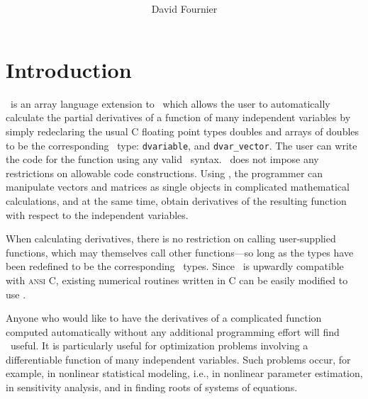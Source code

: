\documentclass{admbmanual}
\title{%
  \largetitlepart{AUTODIF}
  \smalltitlepartnonslanted{%
     A \cplus\ Array Language Extension\\ 
     with Automatic Differentiation\\
     for Use in Nonlinear Modeling and Statistics}
}
\author{David Fournier}
\newcommand{\question}[1]{\bigskip\noindent{\bf #1?}\par\medskip\noindent}
\begin{document}
\maketitle

\tableofcontents



\chapter{Introduction}
\label{ch:introduction}


\question{What is \scAD}
\scAD\ is an array language extension to \cplus\ which
allows the user to automatically calculate the partial derivatives
of a function of many independent variables by simply redeclaring the usual C floating point
types doubles and arrays of doubles to be the corresponding
\scAD\ type: \texttt{dvariable}, and \texttt{dvar\_vector}. 
The user can
write the code for the function using any valid \cplus\ syntax. 
\scAD\ does not impose any restrictions on allowable code constructions. 
Using \scAD, the programmer can manipulate vectors and
matrices as single objects in complicated mathematical calculations,
and at the same time, obtain derivatives of the resulting function with
respect to the independent variables.

When calculating derivatives, there is no restriction on calling user-supplied
functions, which may themselves call other functions---so long as the types have been redefined to be the corresponding \scAD\ types.
Since \cplus\ is upwardly compatible with \textsc{ansi C},
existing numerical routines written in C can be easily 
modified to use \scAD.


\question{Who should use \scAD}
Anyone who would like to have the derivatives 
of a complicated function computed automatically
without any additional programming effort will find \scAD\ useful.
 It is particularly useful for optimization problems involving
a differentiable function of many independent variables. Such
problems occur, for example, in nonlinear statistical modeling,
i.e., in nonlinear parameter estimation, in sensitivity analysis,
and in finding roots of systems of equations.
\end{document}
